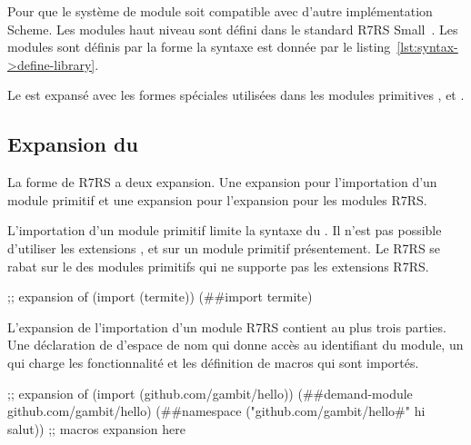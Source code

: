 Pour que le système de module soit compatible avec d'autre implémentation
Scheme.  Les modules haut niveau sont défini dans le standard R7RS
Small~\cite{Scheme:R7RS}. Les modules sont définis par la forme
 la syntaxe est donnée par le
listing~\ref{lst:syntax->define-library}.

Le  est expansé avec les formes spéciales utilisées
dans les modules primitives , 
et .

\subsection{Expansion du }
La forme  de R7RS a deux expansion. Une expansion pour
l'importation d'un module primitif et une expansion pour l'expansion pour
les modules R7RS.

L'importation d'un module primitif limite la syntaxe du .
Il n'est pas possible d'utiliser les extensions , 
et  sur un module primitif présentement. Le  R7RS se rabat
sur le  des modules primitifs qui ne supporte pas les extensions R7RS.\\
\begin{center}
\begin{mplisting}{0.8}
;; expansion of (import (termite))
(##import termite)
\end{mplisting}
\end{center}

L'expansion de l'importation d'un module R7RS contient au plus trois parties.
Une déclaration de d'espace de nom qui donne accès au identifiant du module,
un  qui charge les fonctionnalité et les définition
de macros qui sont importés.

\begin{center}
  \begin{mplisting}{0.8}
;; expansion of (import (github.com/gambit/hello))
(##demand-module github.com/gambit/hello)
(##namespace ("github.com/gambit/hello#" hi salut))
;; macros expansion here
\end{mplisting}
\end{center}




